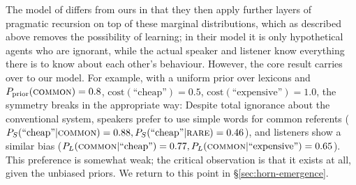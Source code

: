 \documentclass{article} %
\begin{document}
The model of \cite{bergen2012} differs from ours in that they then apply further layers of pragmatic recursion on top of these marginal distributions, which as described above removes the possibility of learning; in their model it is only hypothetical agents who are ignorant, while the actual speaker and listener know everything there is to know about each other's behaviour. However, the core result carries over to our model. For example, with a uniform prior over lexicons and $P_\text{prior}(\text{\textsc{common}}) = 0.8$, $\text{cost}(\text{``cheap''}) = 0.5$, $\text{cost}(\text{``expensive''}) = 1.0$, the symmetry breaks in the appropriate way: Despite total ignorance about the conventional system, speakers prefer to use simple words for common referents ($P_S(\text{``cheap''} | \text{\textsc{common}}) = 0.88, P_S(\text{``cheap''} | \text{\textsc{rare}}) = 0.46$), and listeners show a similar bias ($P_L(\text{\textsc{common}} | \text{``cheap''}) = 0.77, P_L(\text{\textsc{common}} | \text{``expensive''}) = 0.65$). This preference is somewhat weak; the critical observation is that it exists at all, given the unbiased priors. We return to this point in \S\ref{sec:horn-emergence}.




\end{document}
